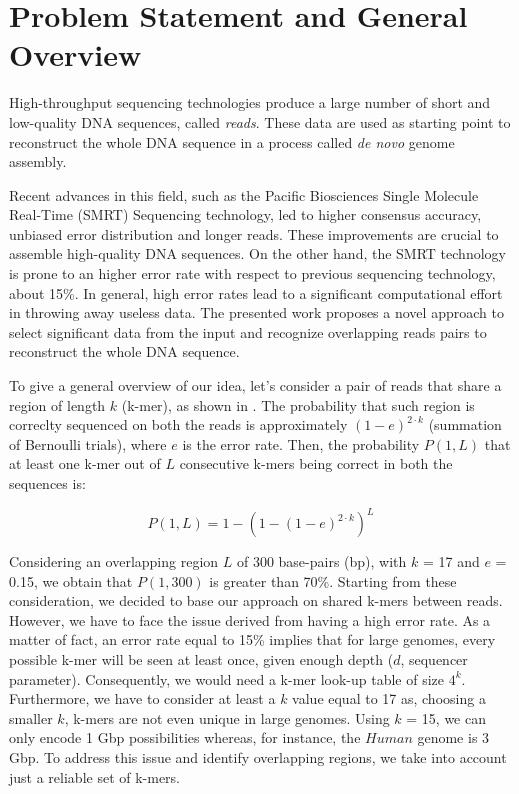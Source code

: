 \documentclass[11pt]{article}
\begin{document}
\maketitle

\section{Problem Statement and General Overview}\label{intro}

High-throughput sequencing technologies produce a large number of short and low-quality DNA sequences, called \emph{reads}.
These data are used as starting point to reconstruct the whole DNA sequence in a process called \emph{de novo} genome assembly.

Recent advances in this field, such as the Pacific Biosciences Single Molecule Real-Time (SMRT) Sequencing technology, led to higher consensus accuracy, unbiased error distribution and longer reads.
These improvements are crucial to assemble high-quality DNA sequences.
On the other hand, the SMRT technology is prone to an higher error rate with respect to previous sequencing technology, about 15\%.
In general, high error rates lead to a significant computational effort in throwing away useless data.
The presented work proposes a novel approach to select significant data from the input and recognize overlapping reads pairs to reconstruct the whole DNA sequence.

To give a general overview of our idea, let's consider a pair of reads that share a region of length $k$ (k-mer), as shown in .
The probability that such region is correclty sequenced on both the reads is approximately $(1-e)^{2 \cdot k}$ (summation of Bernoulli trials), where $e$ is the error rate.
Then, the probability $P(1,L)$ that at least one k-mer out of $L$ consecutive k-mers being correct in both the sequences is:

$$P(1,L) = 1-(1-(1-e)^{2 \cdot k})^{L}$$

Considering an overlapping region $L$ of 300 base-pairs (bp), with $k$ = 17 and $e$ = 0.15, we obtain that $P(1,300)$ is greater than 70\%.
Starting from these consideration, we decided to base our approach on shared k-mers between reads.
However, we have to face the issue derived from having a high error rate. 
As a matter of fact, an error rate equal to 15\% implies that for large genomes, every possible k-mer will be seen at least once, given enough depth ($d$, sequencer parameter).
Consequently, we would need a k-mer look-up table of size $4^{k}$. 
Furthermore, we have to consider at least a $k$ value equal to 17 as, choosing a smaller $k$, k-mers are not even unique in large genomes.
Using $k$ = 15, we can only encode 1 Gbp possibilities whereas, for instance, the $Human$ genome is $3$ Gbp.
To address this issue and identify overlapping regions, we take into account just a reliable set of k-mers.
\end{document}
